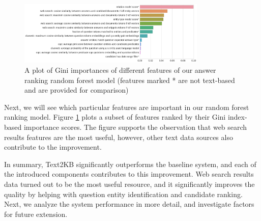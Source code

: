 \begin{figure}
\centering
\includegraphics[width=0.8\textwidth]{img/feature_importances}
\vspace{-4mm}
\caption{A plot of Gini importances of different features of our answer ranking random forest model (features marked * are not text-based and are provided for comparison)}
\label{fig:feature_importances}
\end{figure}

Next, we will see which particular features are important in our random forest ranking model.
Figure \ref{fig:feature_importances} plots a subset of features ranked by their Gini index-based importance scores.
The figure supports the observation that web search results features are the most useful, however, other text data sources also contribute to the improvement.

In summary, Text2KB significantly outperforms the baseline system, and each of the introduced components contributes to this improvement.
Web search results data turned out to be the most useful resource, and it significantly improves the quality by helping with question entity identification and candidate ranking.
Next, we analyze the system performance in more detail, and investigate factors for future extension.
